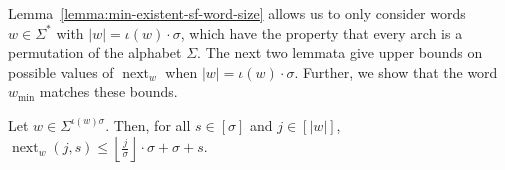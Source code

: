 \documentclass[runningheads,UKenglish,cleveref, autoref, thm-restate]{llncs}
\DeclareMathOperator{\nextAlphPos}{next}
\newif\ifpaper
\begin{document}
Lemma~\ref{lemma:min-existent-sf-word-size} allows us to only consider words $w\in\Sigma^*$ with $|w| = \iota(w)\cdot \sigma$, which have the property that every arch is a permutation of the alphabet $\Sigma$.
The next two lemmata give upper bounds on possible values of $\nextAlphPos_w$ when $|w| = \iota(w)\cdot\sigma$. Further, we show that the word $w_{\min}$ matches these bounds.

\begin{lemma}\label{lemma:shortest-w-next-function-upper-bound}
    Let $w\in\Sigma^{\iota(w) \sigma}$. Then, for all $s \in [\sigma]$ and $j\in[|w|]$,
    $ \nextAlphPos_w(j,s) \leq \left\lfloor\frac{j}{\sigma}\right\rfloor\cdot\sigma + \sigma + s. $
\end{lemma}
\ifpaper
\else
\end{document}
